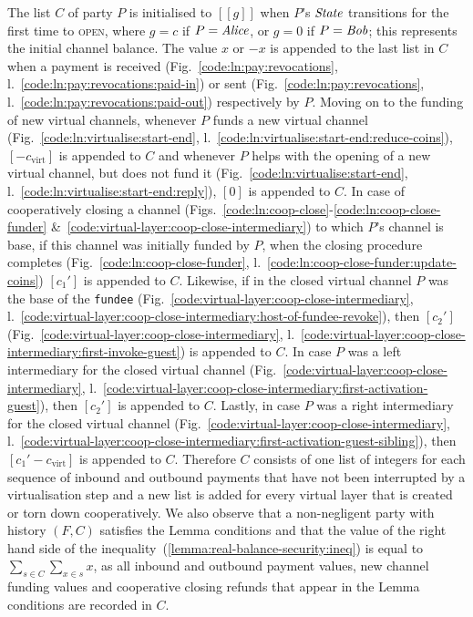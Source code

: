   The list $C$ of party $P$ is initialised to $[[g]]$ when $P$'s $\itistate$
  transitions for the first time to \textsc{open}, where $g = c$ if $P =
  \mathit{Alice}$, or $g = 0$ if $P = \mathit{Bob}$; this represents the initial channel
  balance. The value $x$ or $-x$ is appended to the last list in $C$ when a
  payment is received (Fig.~\ref{code:ln:pay:revocations},
  l.~\ref{code:ln:pay:revocations:paid-in}) or sent
  (Fig.~\ref{code:ln:pay:revocations},
  l.~\ref{code:ln:pay:revocations:paid-out}) respectively by $P$. Moving on to
  the funding of new virtual channels, whenever $P$ funds a new virtual channel
  (Fig.~\ref{code:ln:virtualise:start-end},
  l.~\ref{code:ln:virtualise:start-end:reduce-coins}), $[-c_{\mathrm{virt}}]$
  is appended to $C$ and whenever $P$ helps with the opening of a new virtual
  channel, but does not fund it (Fig.~\ref{code:ln:virtualise:start-end},
  l.~\ref{code:ln:virtualise:start-end:reply}), $[0]$ is appended to $C$.
  In case of cooperatively closing a channel
  (Figs.~\ref{code:ln:coop-close}-\ref{code:ln:coop-close-funder}
  \&~\ref{code:virtual-layer:coop-close-intermediary}) to which $P$'s channel is
  base, if this channel was initially funded by $P$, when the closing procedure
  completes (Fig.~\ref{code:ln:coop-close-funder},
  l.~\ref{code:ln:coop-close-funder:update-coins}) $[c_1']$ is appended to $C$.
  Likewise, if in the closed virtual channel $P$ was the base of the
  \texttt{fundee} (Fig.~\ref{code:virtual-layer:coop-close-intermediary},
  l.~\ref{code:virtual-layer:coop-close-intermediary:host-of-fundee-revoke}),
  then $[c_2']$ (Fig.~\ref{code:virtual-layer:coop-close-intermediary},
  l.~\ref{code:virtual-layer:coop-close-intermediary:first-invoke-guest}) is
  appended to $C$. In case $P$ was a left intermediary for the closed virtual
  channel (Fig.~\ref{code:virtual-layer:coop-close-intermediary},
  l.~\ref{code:virtual-layer:coop-close-intermediary:first-activation-guest}),
  then $[c_2']$ is appended to $C$.
  Lastly, in case $P$ was a right intermediary for the closed
  virtual channel (Fig.~\ref{code:virtual-layer:coop-close-intermediary},
  l.~\ref{code:virtual-layer:coop-close-intermediary:first-activation-guest-sibling}),
  then $[c_1' - c_{\mathrm{virt}}]$ is appended to $C$. Therefore $C$ consists
  of one list of integers for each sequence of inbound and outbound payments
  that have not been interrupted by a virtualisation step and a new list is
  added for every virtual layer that is created or torn down cooperatively. We
  also observe that a non-negligent party with history $(F, C)$ satisfies the
  Lemma conditions and that the value of the right hand side of the
  inequality~(\ref{lemma:real-balance-security:ineq}) is equal to
  $\sum\limits_{s \in C} \sum\limits_{x \in s} x$, as all inbound and outbound
  payment values, new channel funding values and cooperative closing refunds
  that appear in the Lemma conditions are recorded in $C$.

